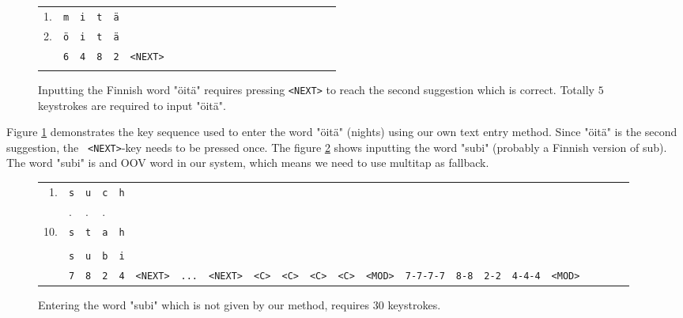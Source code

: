 \documentclass{llncs}
\begin{document}
\begin{figure}[htb!]
\begin{center}
\begin{tabular}{lllllllllllllllllllll}
1. & \texttt{m} & \texttt{i} & \texttt{t} & \texttt{\"{a}} & \\ 
2. & \texttt{\"{o}} & \texttt{i} & \texttt{t} & \texttt{\"{a}} & \\ 
\hline
 & \texttt{6} & \texttt{4} & \texttt{8} & \texttt{2} & \texttt{<NEXT>}\\\\
\end{tabular}
\end{center}
\caption{Inputting the Finnish word "\"{o}it\"{a}" requires pressing \texttt{<NEXT>} to reach the second suggestion which is correct. Totally $5$ keystrokes are required to input "\"{o}it\"{a}".} \label{new-method-kpc-known}
\end{figure}


Figure \ref{new-method-kpc-known} demonstrates the key sequence used
to enter the word "\"{o}it\"{a}" (nights) using our own text entry
method. Since "\"{o}it\"{a}" is the second suggestion, the {\tt
  <NEXT>}-key needs to be pressed once. The figure
\ref{new-method-kpc-unknown} shows inputting the word "subi" (probably
a Finnish version of sub). The word "subi" is and OOV word in our
system, which means we need to use multitap as fallback.

\begin{figure}[htb!]

\begin{center}
\begin{tabular}{rlllllllllllllllllllll}
1. & \texttt{s} & \texttt{u} & \texttt{c} & \texttt{h}\\
 & . & . & .\\
10. & \texttt{s} & \texttt{t} & \texttt{a} & \texttt{h}\\
\\
    & \texttt{s} & \texttt{u} & \texttt{b} & \texttt{i}\\    
\hline
 & \texttt{7} & \texttt{8} & \texttt{2} & \texttt{4} & \texttt{<NEXT>} & \texttt{...} & \texttt{<NEXT>} & \texttt{<C>} & \texttt{<C>} & \texttt{<C>} & \texttt{<C>} & \texttt{<MOD>} & \texttt{7-7-7-7} & \texttt{8-8} & \texttt{2-2} & \texttt{4-4-4} & \texttt{<MOD>}
\end{tabular}

\caption{Entering the word "subi" which is not given by our method, requires $30$ keystrokes.} \label{new-method-kpc-unknown}
\end{center}
\end{figure}
\end{document}
